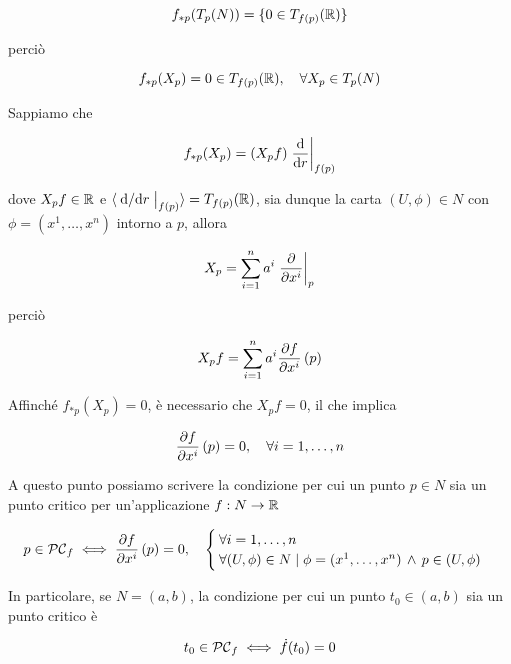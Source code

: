 \begin{equation}
	f_{*p}(T_{p}(N)) = \{0 \in T_{f(p)}(\mathbb{R})\}
\end{equation}

perciò

\begin{equation}
	f_{*p}(X_{p}) = 0 \in T_{f(p)}(\R) \qcomma \forall X_{p} \in T_{p}(N)
\end{equation}

Sappiamo che

\begin{equation}
	f_{*p}(X_{p}) = (X_{p} f) \eval{ \dv{r} }_{f(p)}
\end{equation}

dove $ X_{p} f \in \mathbb{R} $ e $ \langle \eval{ \dv*{r} }_{f(p)} \rangle = T_{f(p)}(\R) $, sia dunque la carta $ (U,\phi) \in N $ con $ \phi = (x^{1},\dots,x^{n}) $ intorno a $ p $, allora

\begin{equation}
	X_{p} = \sum_{i=1}^{n} a^{i} \eval{ \pdv{x^{i}} }_{p}
\end{equation}

perciò

\begin{equation}
	X_{p} f = \sum_{i=1}^{n} a^{i} \pdv{f}{x^{i}} \, (p)
\end{equation}

Affinché $ f_{*p}(X_{p}) = 0 $, è necessario che $ X_{p} f = 0 $, il che implica

\begin{equation}
	\pdv{f}{x^{i}} \, (p) = 0 \qcomma \forall i=1,\dots,n
\end{equation}

A questo punto possiamo scrivere la condizione per cui un punto $ p \in N $ sia un punto critico per un'applicazione $ f : N \to \mathbb{R} $

\begin{equation}
	p \in \PC_{f} %
	\iff %
	\dpdv{f}{x^{i}} \, (p) = 0 \qcomma %
	\begin{cases}
		\forall i=1,\dots,n\\
		\forall (U,\phi) \in N \mid \phi = (x^{1},\dots,x^{n}) \, \wedge \, p \in (U,\phi)
	\end{cases}
\end{equation}

In particolare, se $ N = (a,b) $, la condizione per cui un punto $ t_{0} \in (a,b) $ sia un punto critico è

\begin{equation}
	t_{0} \in \mathcal{PC}_{f} \iff \dot{f}(t_{0}) = 0
\end{equation}

